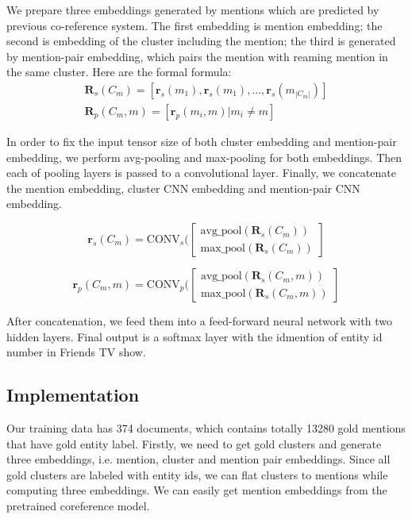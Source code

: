 \documentclass[11pt]{article}
\begin{document}
We prepare three embeddings generated by mentions which are predicted by previous co-reference system. The first embedding is mention embedding; the second is embedding of the cluster including the mention; the third is generated by mention-pair embedding, which pairs the mention with reaming mention in the same cluster. Here are the formal formula:
\begin{eqnarray}
\mathbf{R}_s(C_m) = [\mathbf{r}_s(m_1),\mathbf{r}_s(m_1),...,\mathbf{r}_s(m_{|C_m|})]\\
\mathbf{R}_p(C_m,m) = [\mathbf{r}_p(m_i,m)|m_i \neq m]
\end{eqnarray}



In order to fix the input tensor size of both cluster embedding and mention-pair embedding, we perform avg-pooling and max-pooling for both embeddings. Then each of pooling layers is passed to a convolutional layer. Finally, we concatenate the mention embedding, cluster CNN embedding and mention-pair CNN embedding.

\begin{equation}
\mathbf{r}_s(C_m) = \textrm{CONV}_s(\begin{bmatrix}
\text{avg\_pool}(\mathbf{R}_s(C_m))\\
\text{max\_pool}(\mathbf{R}_s(C_m))
\end{bmatrix}
\end{equation}


\begin{equation}
\mathbf{r}_p(C_m,m) = \textrm{CONV}_p(\begin{bmatrix}
\text{avg\_pool}(\mathbf{R}_s(C_m,m))\\
\text{max\_pool}(\mathbf{R}_s(C_m,m))
\end{bmatrix}
\end{equation}


After concatenation, we feed them into a feed-forward neural network with two hidden layers. Final output is a softmax layer with the idmention of entity id number in Friends TV show.

\subsection{Implementation}
Our training data has 374 documents, which contains totally 13280 gold mentions that have gold entity label. Firstly, we need to get gold clusters and generate three embeddings, i.e. mention, cluster and mention pair embeddings. Since all gold clusters are labeled with entity ids, we can flat clusters to mentions while computing three embeddings. We can easily get mention embeddings from the pretrained coreference model.
\end{document}
